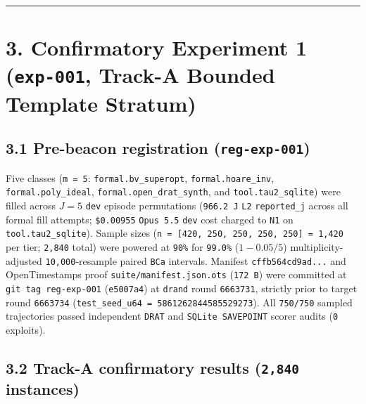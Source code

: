 \documentclass[10pt,letterpaper]{article}
\begin{document}
\begin{center}\rule{0.5\linewidth}{0.5pt}\end{center}

\section{\texorpdfstring{3. Confirmatory Experiment 1 (\texttt{exp-001},
Track-A Bounded Template
Stratum)}{3. Confirmatory Experiment 1 (exp-001, Track-A Bounded Template Stratum)}}\label{confirmatory-experiment-1-exp-001-track-a-bounded-template-stratum}

\subsection{\texorpdfstring{3.1 Pre-beacon registration
(\texttt{reg-\allowbreak{}exp-\allowbreak{}001})}{3.1 Pre-beacon registration (reg-exp-001)}}\label{pre-beacon-registration-reg-exp-001}

Five classes (\texttt{m\ =\ 5}: \texttt{formal.\allowbreak{}bv\_\allowbreak{}superopt},
\texttt{formal.\allowbreak{}hoare\_\allowbreak{}inv}, \texttt{formal.\allowbreak{}poly\_\allowbreak{}ideal},
\texttt{formal.\allowbreak{}open\_\allowbreak{}drat\_\allowbreak{}synth}, and \texttt{tool.\allowbreak{}tau2\_\allowbreak{}sqlite}) were
filled across \(J = 5\) \texttt{dev} episode permutations
(\texttt{966.2\ J} \texttt{L2} \texttt{reported\_\allowbreak{}j} across all formal
fill attempts; \texttt{\$0.00955} \texttt{Opus\ 5.5} \texttt{dev} cost
charged to \texttt{N1} on \texttt{tool.\allowbreak{}tau2\_\allowbreak{}sqlite}). Sample sizes
(\texttt{n\ =\ {[}420,\ 250,\ 250,\ 250,\ 250{]}\ =\ 1,420} per tier;
\texttt{2,840} total) were powered at \texttt{90\%} for \texttt{99.0\%}
(\(1 - 0.05/5\)) multiplicity-adjusted \texttt{10,000}-resample paired
\texttt{BCa} intervals. Manifest \texttt{cffb564cd9ad.\allowbreak{}.\allowbreak{}.\allowbreak{}} and
OpenTimestamps proof \texttt{suite/\allowbreak{}manifest.\allowbreak{}json.\allowbreak{}ots} (\texttt{172\ B})
were committed at \texttt{git\ tag\ reg-\allowbreak{}exp-\allowbreak{}001} (\texttt{e5007a4}) at
\texttt{drand} round \texttt{6663731}, strictly prior to target round
\texttt{6663734} (\texttt{test\_\allowbreak{}seed\_\allowbreak{}u64\ =\ 58612628\allowbreak{}44585529273}). All
\texttt{750/750} sampled trajectories passed independent \texttt{DRAT}
and \texttt{SQLite\ SAVEPOINT} scorer audits (\texttt{0} exploits).

\subsection{\texorpdfstring{3.2 Track-A confirmatory results
(\texttt{2,840}
instances)}{3.2 Track-A confirmatory results (2,840 instances)}}\label{track-a-confirmatory-results-2840-instances}
\end{document}
